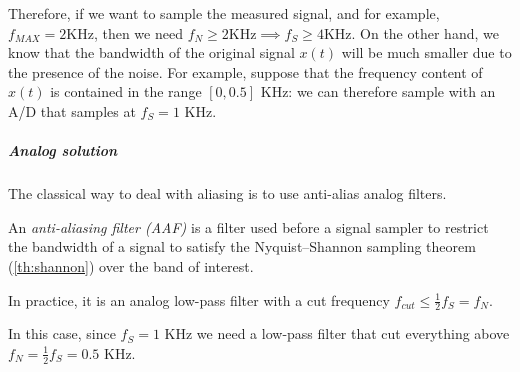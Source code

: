 \begin{appendices}
Therefore, if we want to sample the measured signal, and for example, $f_{MAX} = 2 \text{KHz}$, then we need $f_N \ge 2 \text{KHz} \implies f_S \ge 4 \text{KHz}$. On the other hand, we know that the bandwidth of the original signal $x(t)$ will be much smaller due to the presence of the noise. 
For example, suppose that the frequency content of $x(t)$ is contained in the range $[0, 0.5]$ KHz: we can therefore sample with an A/D that samples at $f_S = 1$ KHz.

\subparagraph{Analog solution} The classical way to deal with aliasing is to use anti-alias analog filters. 

\begin{rem}
    An \emph{anti-aliasing filter (AAF)} is a filter used before a signal sampler to restrict the bandwidth of a signal to satisfy the Nyquist–Shannon sampling theorem (\ref{th:shannon}) over the band of interest.
    
    In practice, it is an analog low-pass filter with a cut frequency $f_{cut} \le \frac{1}{2} f_S = f_N$. 
\end{rem}

\begin{figure}[H]
    \centering
\end{figure}

In this case, since $f_S = 1$ KHz we need a low-pass filter that cut everything above $f_N = \frac{1}{2} f_S = 0.5$ KHz.

\begin{figure}[H]
    \centering
\end{figure}
\end{appendices}
